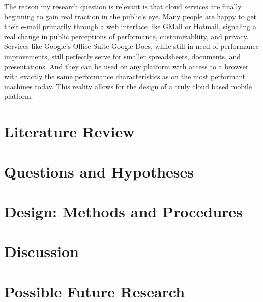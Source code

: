 \documentclass[12pt,oneside,letterpaper,titlepage]{report}
\begin{document}

The reason my research question is relevant is that cloud services are finally
beginning to gain real traction in the public's eye.  Many people are happy to
get their e-mail primarily through a web interface like GMail or Hotmail,
signaling a real change in public perceptions of performance, customizabliity,
and privacy.  Services like Google's Office Suite Google Docs, while still in
need of performance improvements, still perfectly serve for smaller
spreadsheets, documents, and presentations.  And they can be used on any
platform with access to a browser with exactly the same performance
characteristics as on the most performant machines today.  This reality allows
for the design of a truly cloud based mobile platform.

\chapter{Literature Review}

\newpage

  

\chapter{Questions and Hypotheses}

\newpage

  

\chapter{Design: Methods and Procedures}

\newpage

  

\chapter{Discussion}

\newpage

  

\chapter{Possible Future Research}

\newpage
\end{document}
